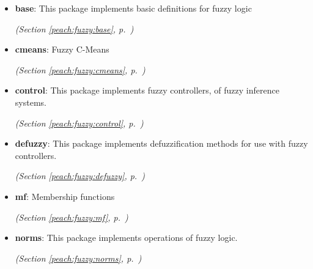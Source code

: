 \begin{itemize}
\setlength{\parskip}{0ex}
\item \textbf{base}: 
This package implements basic definitions for fuzzy logic


  \textit{(Section \ref{peach:fuzzy:base}, p.~\pageref{peach:fuzzy:base})}

\item \textbf{cmeans}: 
Fuzzy C-Means


  \textit{(Section \ref{peach:fuzzy:cmeans}, p.~\pageref{peach:fuzzy:cmeans})}

\item \textbf{control}: 
This package implements fuzzy controllers, of fuzzy inference systems.


  \textit{(Section \ref{peach:fuzzy:control}, p.~\pageref{peach:fuzzy:control})}

\item \textbf{defuzzy}: 
This package implements defuzzification methods for use with fuzzy controllers.


  \textit{(Section \ref{peach:fuzzy:defuzzy}, p.~\pageref{peach:fuzzy:defuzzy})}

\item \textbf{mf}: 
Membership functions


  \textit{(Section \ref{peach:fuzzy:mf}, p.~\pageref{peach:fuzzy:mf})}

\item \textbf{norms}: 
This package implements operations of fuzzy logic.


  \textit{(Section \ref{peach:fuzzy:norms}, p.~\pageref{peach:fuzzy:norms})}

\end{itemize}

